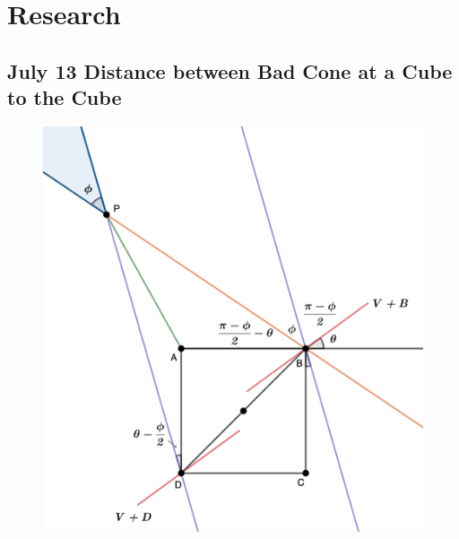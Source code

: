\section{Research}

\subsection{July 13 Distance between Bad Cone at a Cube to the Cube}

\begin{figure}[H]
    \centering
    \includegraphics[width=.66\textwidth]{images/dist-CBQ2Q.png}
\end{figure}

